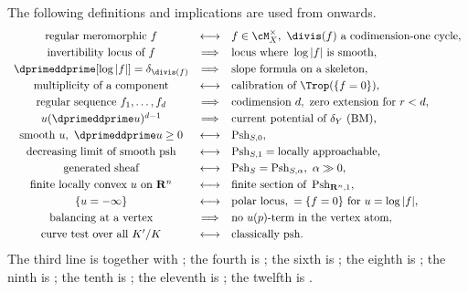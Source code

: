 The following definitions and implications are used from
 onwards.
\begingroup
\setlength{\arraycolsep}{2pt}
\[
\begin{array}{ccl}
 \text{regular meromorphic }f
 &\longleftrightarrow&
 f\in\cM_X^\times,\ \divis(f)\text{ a codimension-one cycle},\\[1mm]
 \text{invertibility locus of }f
 &\Longrightarrow&
 \text{locus where }\log|f|\text{ is smooth},\\[1mm]
 \dprimeddprime[\log|f|]=\delta_{\divis(f)}
 &\Longrightarrow&
 \text{slope formula on a skeleton},\\[1mm]
 \text{multiplicity of a component}
 &\longleftrightarrow&
 \text{calibration of }\Trop(\{f=0\}),\\[1mm]
 \text{regular sequence }f_1,\dots,f_d
 &\Longrightarrow&
 \text{codimension }d,\ \text{zero extension for }r<d,\\[1mm]
 u(\dprimeddprime u)^{d-1}
 &\Longrightarrow&
 \text{current potential of }\delta_Y\text{ (BM)},\\[1mm]
 \text{smooth }u,\ \dprimeddprime u\ge0
 &\longleftrightarrow&
 \operatorname{Psh}_{S,0},\\[1mm]
 \text{decreasing limit of smooth psh}
 &\longleftrightarrow&
 \operatorname{Psh}_{S,1}=\text{locally approachable},\\[1mm]
 \text{generated sheaf}
 &\longleftrightarrow&
 \operatorname{Psh}_S=\operatorname{Psh}_{S,\alpha},\ \alpha\gg0,\\[1mm]
 \text{finite locally convex }u\text{ on }\mathbf R^n
 &\longleftrightarrow&
 \text{finite section of }\operatorname{Psh}_{\mathbf R^n,1},\\[1mm]
 \{u=-\infty\}
 &\longleftrightarrow&
 \text{polar locus},\ =\{f=0\}\text{ for }u=\log|f|,\\[1mm]
 \text{balancing at a vertex}
 &\Longrightarrow&
 \text{no }u(p)\text{-term in the vertex atom},\\[1mm]
 \text{curve test over all }K'/K
 &\longleftrightarrow&
 \text{classically psh}.
\end{array}
\]
\endgroup
The third line is  together with
; the fourth is
; the sixth is
; the eighth is
; the ninth is
; the tenth is
; the eleventh is
; the twelfth is
.

